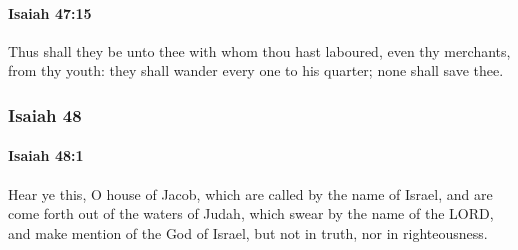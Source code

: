 		\paragraph{Isaiah 47:15} %
			\label{ISAIAH-47-15}

			Thus shall they be unto thee with whom thou hast laboured, even thy merchants, from thy youth: they shall wander every one to his quarter; none shall save thee.

	\subsubsection{Isaiah 48} %
		\label{ISAIAH-48}

		\paragraph{Isaiah 48:1} %
			\label{ISAIAH-48-1}

			Hear ye this, O house of Jacob, which are called by the name of Israel, and are come forth out of the waters of Judah, which swear by the name of the LORD, and make mention of the God of Israel, but not in truth, nor in righteousness.

